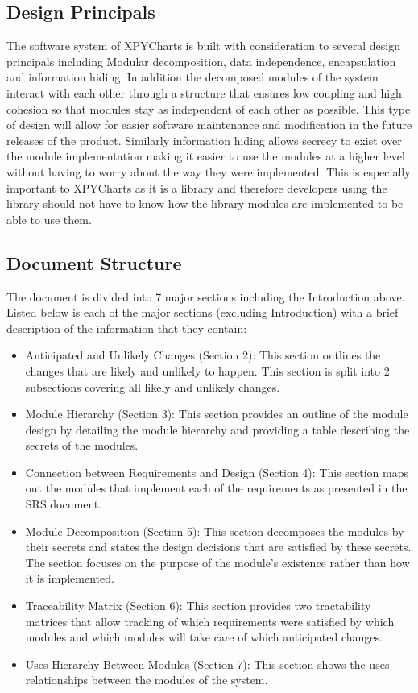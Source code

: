 \documentclass[12pt, titlepage]{article}
\begin{document}
\subsection{Design Principals}
The software system of XPYCharts is built with consideration to several design principals including Modular decomposition, data independence, encapsulation and information hiding. In addition the decomposed modules of the system interact with each other through a structure that ensures low coupling and high cohesion so that modules stay as independent of each other as possible. This type of design will allow for easier software maintenance and modification in the future releases of the product. Similarly information hiding allows secrecy to exist over the module implementation making it easier to use the modules at a higher level without having to worry about the way they were implemented. This is especially important to XPYCharts as it is a library and therefore developers using the library should not have to know how the library modules are implemented to be able to use them.
\subsection{Document Structure}
The document is divided into 7 major sections including the Introduction above. Listed below is each of the major sections (excluding Introduction) with a brief description of the information that they contain:
\begin{itemize}
\item Anticipated and Unlikely Changes (Section 2): This section outlines the changes that are likely and unlikely to happen. This section is split into 2 subsections covering all likely and unlikely changes.
\item Module Hierarchy (Section 3): This section provides an outline of the module design by detailing the module hierarchy and providing a table describing the secrets of the modules.
\item Connection between Requirements and Design (Section 4): This section maps out the modules that implement each of the requirements as presented in the SRS document.
\item Module Decomposition (Section 5): This section decomposes the modules by their secrets and states the design decisions that are satisfied by these secrets. The section focuses on the purpose of the module’s existence rather than how it is implemented.
\item Traceability Matrix (Section 6): This section provides two tractability matrices that allow tracking of which requirements were satisfied by which modules and which modules will take care of which anticipated changes.
\item Uses Hierarchy Between Modules (Section 7): This section shows the uses relationships between the modules of the system.
\end{itemize}
\end{document}
